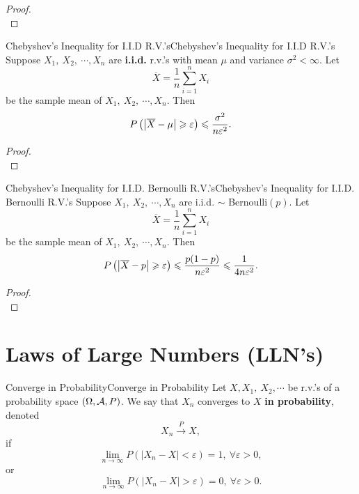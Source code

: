 \documentclass{elegantbook}
\begin{document}
\begin{proof}
\\[4cm]\vspace{0.01cm}
\end{proof}

\begin{theorem}{Chebyshev's Inequality for I.I.D R.V.'s}{Chebyshev's Inequality for I.I.D R.V.'s}
Suppose \(X_{1},\ X_{2},\ \cdots,X_{n}\) are \textbf{i.i.d.} r.v.'s with
mean \(\mu\) and variance \(\sigma^{2} < \infty\). Let 
\[\overline{X} = \frac{1}{n}\sum_{i = 1}^{n}X_{i}\]
be the sample mean of \( X_{1},\ X_{2},\ \cdots,X_{n}.\)
Then
\[P\left( \left| \overline{X} - \mu \right| \geqslant \varepsilon \right) \leqslant \frac{\sigma^{2}}{n\varepsilon^{2}}.\]
\end{theorem}

\begin{proof}
\\[4cm]\vspace{0.01cm}
\end{proof}

\begin{theorem}{Chebyshev's Inequality for I.I.D. Bernoulli R.V.'s}{Chebyshev's Inequality for I.I.D. Bernoulli R.V.'s}
Suppose \(X_{1},\ X_{2},\ \cdots,X_{n}\) are i.i.d. \(\sim\) Bernoulli\((p)\). Let 
\[\overline{X} = \frac{1}{n}\sum_{i = 1}^{n}X_{i}\]
be the sample mean of \( X_{1},\ X_{2},\ \cdots,X_{n}.\)
Then
\[P\left( \left| \overline{X} - p \right| \geqslant \varepsilon \right) \leqslant \frac{p(1 - p)}{n\varepsilon^{2}} \leqslant \frac{1}{4n\varepsilon^{2}}.\]
\end{theorem}

\begin{proof}
\\[4cm]\vspace{0.01cm}
\end{proof}

\section{Laws of Large Numbers (LLN's)}

\begin{definition}{Converge in Probability}{Converge in Probability}
Let \(X,X_{1},\ X_{2},\cdots\) be r.v.'s of a probability space $(\Omega,\mathcal{A}, P)$. We say that \(X_{n}\) converges to \(X\) \textbf{in probability}, denoted
\[X_{n}\xrightarrow{\ P\ }X,\]
if
\[\lim_{n \rightarrow \infty}{P(\left| X_{n} - X \right| < \varepsilon)} = 1,\ \forall\varepsilon > 0,\]
or
\[\lim_{n \rightarrow \infty}{P(\left| X_{n} - X \right| > \varepsilon)} = 0,\ \forall\varepsilon > 0.\]
\end{definition}
\end{document}
